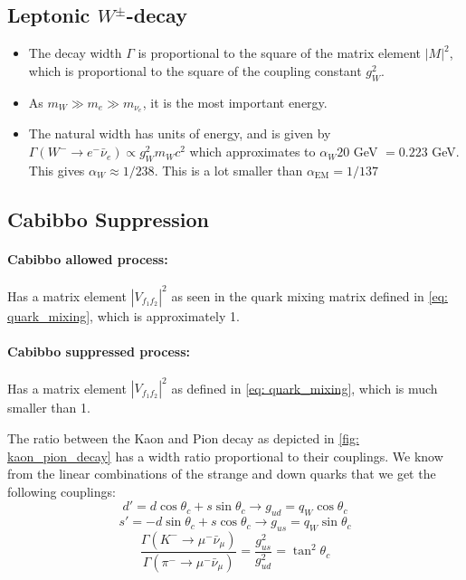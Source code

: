   \subsection{Leptonic $W^{\pm}$-decay}
  \begin{itemize}
    \item The decay width $Γ$ is proportional to the square of the matrix element $|M|^2$, which is proportional to the square of the coupling constant $g_{W}^2$.
    \item As $m_{W} ≫ m_e ≫ m_{ν_e}$, it is the most important energy. 
    \item The natural width has units of energy, and is given by $Γ(W^{-} → e^{-} \bar{ν}_e) ∝ g^2_{W}m_{W}c^2$ which approximates to $α_{W}20$ GeV $= 0.223$ GeV. This gives $α_{W} ≈ 1/238$. This is a lot smaller than $α_{\text{EM}} = 1/137$
  \end{itemize}
  
  
  \subsection{Cabibbo Suppression}
  \paragraph{Cabibbo allowed process:} Has a matrix element $\left|V_{f_1f_2}\right|^2$ as seen in the quark mixing matrix defined in \cref{eq: quark_mixing}, which is approximately 1. 
  \paragraph{Cabibbo suppressed process:} Has a matrix element $\left|V_{f_1f_2}\right|^2$ as defined in \cref{eq: quark_mixing}, which is much smaller than 1.

  The ratio between the Kaon and Pion decay as depicted in \cref{fig: kaon_pion_decay} has a width ratio proportional to their couplings. We know from the linear combinations of the strange and down quarks that we get the following couplings:
  \begin{equation}
    d' = d \cos θ_c + s \sin θ_c → g_{ud} = q_{W}\cos θ_c
  \end{equation}
  \begin{equation}
    s' = -d \sin θ_c + s \cos θ_c → g_{us} = q_{W}\sin θ_c
  \end{equation}
  \begin{equation}
    \frac{Γ(K^{-} → μ^{-} \bar{ν}_{μ})}{Γ(π^{-} → μ^{-} \bar{ν}_{μ})} = \frac{g^2_{us}}{g^2_{ud}} = \tan^2 θ_c
  \end{equation}

